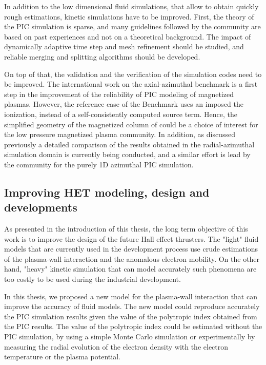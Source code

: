     In addition to the low dimensional fluid simulations, that allow to obtain quickly rough estimations, kinetic simulations have to be improved.
    First, the theory of the PIC simulation is sparse, and many guidelines followed by the community are based on past experiences and not on a theoretical background.
    The impact of dynamically adaptive time step and mesh refinement should be studied, and reliable merging and splitting algorithms should be developed.

    On top of that, the validation and the verification of the simulation codes need to be improved.
    The international work on the axial-azimuthal benchmark \citep{charoy2019} is a first step in the improvement of the reliability of PIC modeling of magnetized plasmas.
    However, the reference case of the Benchmark uses an imposed the ionization, instead of a self-consistently computed source term.
    Hence, the simplified geometry of the magnetized column of \citet{lucken2019} could be a choice of interest for the low pressure magnetized plasma community.
    In addition, as discussed previously a detailed comparison of the results obtained in the radial-azimuthal simulation domain is currently being conducted, and a similar effort is lead by the community for the purely 1D azimuthal PIC simulation.
    

  \subsection{Improving HET modeling, design and developments } 

    As presented in the introduction of this thesis, the long term objective of this work is to improve the design of the future Hall effect thrusters.
    The "light" fluid models that are currently used in the development process use crude estimations of the plasma-wall interaction and the anomalous electron mobility.
    On the other hand, "heavy" kinetic simulation that can model accurately such phenomena are too costly to be used during the industrial development.

    In this thesis, we proposed a new model for the plasma-wall interaction that can improve the accuracy of fluid models.
    The new model could reproduce accurately the PIC simulation results given the value of the polytropic index obtained from the PIC results.
    The value of the polytropic index could be estimated without the PIC simulation, by using a simple Monte Carlo simulation or experimentally by measuring the radial evolution of the electron density with the electron temperature or the plasma potential.

